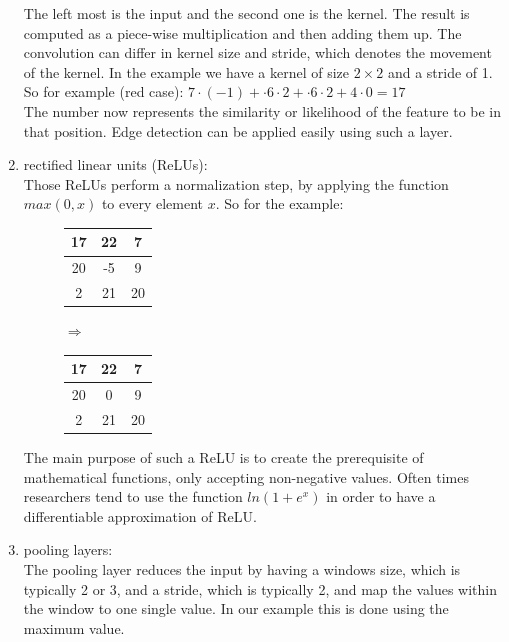 \begin{enumerate}
\begin{figure}[H]
	\end{figure}
	The left most is the input and the second one is the kernel. The result is computed as a piece-wise multiplication and then adding them up. The convolution can differ in kernel size and stride, which denotes the movement of the kernel. In the example we have a kernel of size $2\times2$ and a stride of 1.\\
	So for example (red case): $7\cdot(-1)+\cdot6\cdot2+\cdot6\cdot2+4\cdot0=17$\\
	The number now represents the similarity or likelihood of the feature to be in that position. Edge detection can be applied easily using such a layer. \cite{hubel1968receptive}
\item rectified linear units (ReLUs):\\
	Those ReLUs perform a normalization step, by applying the function $max(0,x)$ to every element $x$. So for the example:
	\begin{figure}[H]
		\centering
		\begin{tabular}{|c|c|c|} \hline
			17 & 22 & 7\\\hline
			20 & -5 & 9\\\hline
			2 & 21 & 20\\\hline
		\end{tabular}
		$\Rightarrow$
		\begin{tabular}{|c|c|c|} \hline
			17 & 22 & 7\\\hline
			20 & 0 & 9\\\hline
			2 & 21 & 20\\\hline
		\end{tabular}
	\end{figure}
	The main purpose of such a ReLU is to create the prerequisite of mathematical functions, only accepting non-negative values. Often times researchers tend to use the function $ln(1+e^x)$ in order to have a differentiable approximation of ReLU. 
\item pooling layers:\\
	The pooling layer reduces the input by having a windows size, which is typically 2 or 3, and a stride, which is typically 2, and map the values within the window to one single value. In our example this is done using the maximum value.

\end{enumerate}
